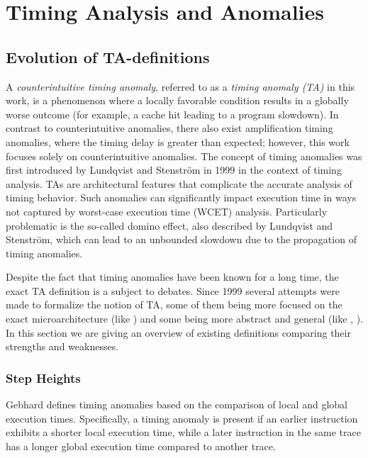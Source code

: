 \chapter{Timing Analysis and Anomalies}

\section{Evolution of TA-definitions}

A \textit{counterintuitive timing anomaly}, referred to as a \textit{timing anomaly (TA)} in this work, is a phenomenon where a locally favorable condition results in a globally worse outcome (for example, a cache hit leading to a program slowdown). In contrast to counterintuitive anomalies, there also exist amplification timing anomalies, where the timing delay is greater than expected; however, this work focuses solely on counterintuitive anomalies. The concept of timing anomalies was first introduced by Lundqvist and Stenstr\"om in 1999 \cite{lundqvist_timing_1999} in the context of timing analysis. TAs are architectural features that complicate the accurate analysis of timing behavior. Such anomalies can significantly impact execution time in ways not captured by worst-case execution time (WCET) analysis. Particularly problematic is the so-called domino effect, also described by Lundqvist and Stenstr\"om, which can lead to an unbounded slowdown due to the propagation of timing anomalies.

Despite the fact that timing anomalies have been known for a long time, the exact TA definition is a subject to debates. Since 1999 several attempts were made to formalize the notion of TA, some of them being more focused on the exact microarchitecture (like \cite{gruin_minotaur_2023}) and some being more abstract and general (like \cite{binder_definitions_2022}, \cite{hahn_design_2020}). In this section we are giving an overview of existing definitions comparing their strengths and weaknesses.

\subsection{Step Heights}
Gebhard \cite{gebhard_timing_2012} defines timing anomalies based on the comparison of local and global execution times. Specifically, a timing anomaly is present if an earlier instruction exhibits a shorter local execution time, while a later instruction in the same trace has a longer global execution time compared to another trace.

